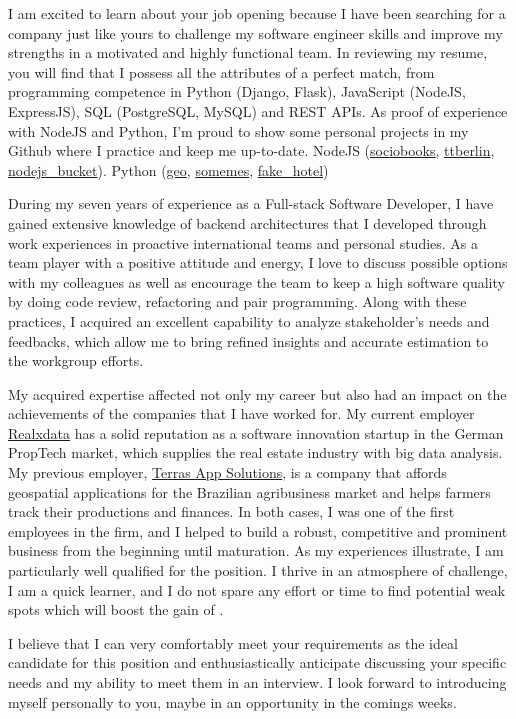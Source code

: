I am excited to learn about your job opening because I have been searching for a
company just like yours to challenge my software engineer skills and improve my
strengths in a motivated and highly functional team. In reviewing my resume,
you will find that I possess all the attributes of a perfect match, from programming
competence in Python (Django, Flask), JavaScript (NodeJS, ExpressJS), SQL
(PostgreSQL, MySQL) and REST APIs. As proof of experience with NodeJS and Python,
I'm proud to show some personal projects in my Github where I practice and keep
me up-to-date. NodeJS (\href{https://github.com/joaosr/sociobooks}{sociobooks},
\href{https://github.com/joaosr/ttberlin}{ttberlin}, \href{https://github.com/joaosr/nodejs_bucket}{nodejs\_bucket}).
Python (\href{https://github.com/joaosr/geo}{geo}, \href{https://github.com/joaosr/somemes/tree/target}{somemes},
\href{https://github.com/joaosr/fake_hotel}{fake\_hotel})

During my seven years of experience as a Full-stack Software Developer, I have
gained extensive knowledge of backend architectures that
I developed through work experiences in proactive international teams and personal
studies. As a team player with a positive attitude and energy, I love to discuss
possible options with my colleagues as well as encourage the team to keep a high
software quality by doing code review, refactoring and pair programming. Along
with these practices, I acquired an excellent capability to analyze stakeholder's
needs and feedbacks, which allow me to bring refined insights and accurate estimation
to the workgroup efforts.

My acquired expertise affected not only my career but also had an impact on the
achievements of the companies that I have worked for. My current employer
\href{https://www.realxdata.com/}{Realxdata} has a solid reputation as a software
innovation startup in the German PropTech market, which supplies the real estate
industry with big data analysis. My previous employer, \href{http://terras.agr.br/}{Terras App Solutions},
is a company that affords geospatial applications for the Brazilian agribusiness
market and helps farmers track their productions and finances. In both cases,
I was one of the first employees in the firm, and I helped to build a robust,
competitive and prominent business from the beginning until maturation. As my
experiences illustrate, I am particularly well qualified for the position.
I thrive in an atmosphere of challenge, I am a quick learner, and I do not spare
any effort or time to find potential weak spots which will boost the gain of \companyName.

I believe that I can very comfortably meet your requirements as the ideal candidate
for this position and enthusiastically anticipate discussing your specific needs
and my ability to meet them in an interview. I look forward to introducing myself
personally to you, maybe in an opportunity in the comings weeks.
